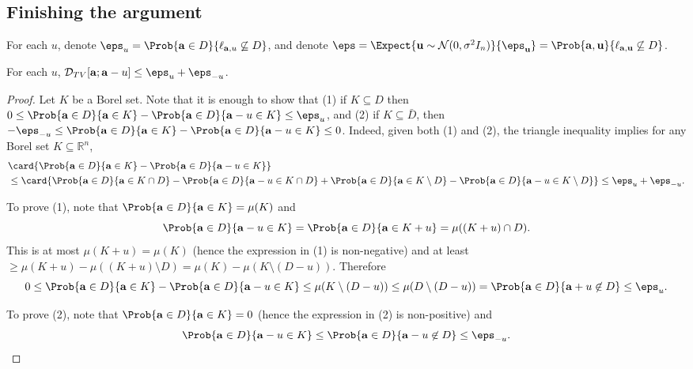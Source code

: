 \subsection{Finishing the argument}
For each $u$, denote $\eps_u = \Prob{{\bf a}\in D}{\ell_{{\bf a},u}\not\subseteq D}$,
and denote $\eps = \Expect{{\bf u}\sim\mathcal{N}(0,\sigma^2 I_n)}{\eps_{\bf u}} = \Prob{{\bf a}, {\bf u}}{\ell_{{\bf a}, {\bf u}}\not\subseteq D}$.
\begin{claim}\label{cl:tv5}
For each $u$, $\mathcal{D}_{TV}[{\bf a}; {\bf a}-u]\leq \eps_u + \eps_{-u}$.
\end{claim}
\begin{proof}
  Let $K$ be a Borel set.
  Note that it is enough to show that
  (1) if $K\subseteq D$ then $0\leq \Prob{{\bf a}\in D}{{\bf a}\in K} - \Prob{{\bf a}\in D}{{\bf a}-u\in K}\leq \eps_u$,
  and (2) if $K\subseteq\bar{D}$, then $-\eps_{-u}\leq \Prob{{\bf a}\in D}{{\bf a}\in K} - \Prob{{\bf a}\in D}{{\bf a}-u\in K}\leq 0$.
  Indeed, given both (1) and (2), the triangle inequality implies for any Borel set $K\subseteq\mathbb{R}^n$,
  \begin{align*}
  &\card{\Prob{{\bf a}\in D}{{\bf a}\in K} - \Prob{{\bf a}\in D}{{\bf a}-u\in K}}\\
  &\leq
  \card{
  \Prob{{\bf a}\in D}{{\bf a}\in K\cap D}-\Prob{{\bf a}\in D}{{\bf a}-u\in K\cap D}
  +\Prob{{\bf a}\in D}{{\bf a}\in K\setminus D}-\Prob{{\bf a}\in D}{{\bf a}-u\in K\setminus D}}
  \leq \eps_u+\eps_{-u}.
  \end{align*}

  To prove (1), note that
  $\Prob{{\bf a}\in D}{{\bf a}\in K}=\mu(K)$
  and
  \[
  \Prob{{\bf a}\in D}{{\bf a}-u\in K} = \Prob{{\bf a}\in D}{{\bf a}\in K+u} = \mu((K+u)\cap D).
  \]
  This is at most $\mu(K+u) = \mu(K)$ (hence the expression in (1) is non-negative)
  and at least $\geq \mu(K+u) - \mu((K+u)\setminus D)= \mu(K) - \mu(K\setminus (D-u))$.
  Therefore
  \[
  0\leq \Prob{{\bf a}\in D}{{\bf a}\in K} - \Prob{{\bf a}\in D}{{\bf a}-u\in K}
  \leq \mu(K\setminus (D-u))
  \leq \mu(D\setminus (D-u))
  = \Prob{{\bf a}\in D}{{\bf a}+u\not\in D}
  \leq \eps_u.
  \]

  To prove (2), note that $\Prob{{\bf a}\in D}{{\bf a}\in K} = 0$ (hence the expression in (2) is non-positive)
  and
  \[
  \Prob{{\bf a}\in D}{{\bf a}-u\in K} \leq \Prob{{\bf a}\in D}{{\bf a}-u\not\in D} \leq \eps_{-u}.\qedhere
  \]
\end{proof}


